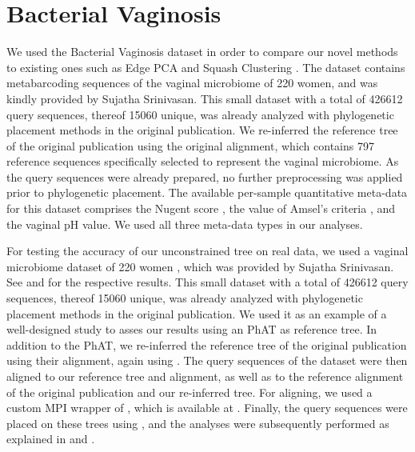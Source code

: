 \section{Bacterial Vaginosis}
\label{supp:sec:DetailsEmpiricalDatasets:sub:BV}

We used the Bacterial Vaginosis dataset \cite{Srinivasan2012} in order to compare our novel methods to
existing ones such as Edge PCA and Squash Clustering \cite{Matsen2011a,Evans2012}.
The dataset contains metabarcoding sequences of the vaginal microbiome of \num{220} women,
and was kindly provided by Sujatha Srinivasan.
This small dataset with a total of \num{426 612} query sequences, thereof \num{15 060} unique,
was already analyzed with phylogenetic placement methods in the original publication.
We re-inferred the reference tree of the original publication using the original alignment,
which contains \num{797} reference sequences specifically selected to represent the vaginal microbiome.
As the query sequences were already prepared,
no further preprocessing was applied prior to phylogenetic placement.
The available per-sample quantitative meta-data for this dataset comprises
the Nugent score \cite{Nugent1991}, the value of Amsel's criteria \cite{Amsel1983}, and the vaginal pH value.
We used all three meta-data types in our analyses.


For testing the accuracy of our unconstrained  tree on real data,
we used a vaginal microbiome dataset of 220 women \citep{Srinivasan2012},
which was provided by Sujatha Srinivasan.
See  and  for the respective results.
This small dataset with a total of \num{426 612} query sequences, thereof \num{15 060} unique,
was already analyzed with phylogenetic placement methods in the original publication.
We used it as an example of a well-designed study to asses our results using an \ac{PhAT} as reference tree.
In addition to the  \ac{PhAT},
we re-inferred the reference tree of the original publication using their alignment,
again using  \citep{Stamatakis2014}.
The query sequences of the dataset were then aligned to our reference tree and alignment,
as well as to the reference alignment of the original publication and our re-inferred tree.
For aligning, we used a custom MPI wrapper of  \citep{Berger2011a,Berger2012},
which is available at \citep{PaPaRaMPI}.
Finally, the query sequences were placed on these trees using  \citep{Barbera2018},
and the analyses were subsequently performed as explained in  and .

